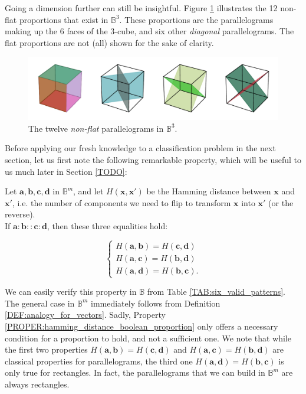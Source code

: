 Going a dimension further can still be insightful. Figure \ref{FIG:cubes_in_B3}
illustrates the 12 non-flat proportions that exist in $\mathbb{B}^3$. These
proportions are the parallelograms making up the 6 faces of the $3$-cube, and
six other \textit{diagonal} parallelograms. The flat proportions are not (all)
shown for the sake of clarity.

\begin{figure}[!h]
\centering
\includegraphics[width=\linewidth]{figures/cubes_in_B3.pdf}
  \caption{The twelve \textit{non-flat} parallelograms in $\mathbb{B}^3$.}
\label{FIG:cubes_in_B3}
\end{figure}

Before applying our fresh knowledge to a classification problem in the next
section, let us first note the following remarkable property, which will be
useful to us much later in Section \ref{TODO}:

\begin{property}
  \label{PROPER:hamming_distance_boolean_proportion}
  Let $\mathbf{a}, \mathbf{b},\mathbf{c}, \mathbf{d}$ in $\mathbb{B}^m$, and
  let $H(\mathbf{x}, \mathbf{x'})$ be the Hamming distance between $\mathbf{x}$
  and $\mathbf{x'}$, i.e. the number of components we need to flip to transform
  $\mathbf{x}$ into $\mathbf{x'}$ (or the reverse).\\
  If $\mathbf{a} : \mathbf{b}
  :: \mathbf{c} : \mathbf{d}$, then these three equalities hold:

  $$
  \begin{cases}
    H(\mathbf{a}, \mathbf{b}) = H(\mathbf{c}, \mathbf{d})\\
    H(\mathbf{a}, \mathbf{c}) = H(\mathbf{b}, \mathbf{d})\\
    H(\mathbf{a}, \mathbf{d}) = H(\mathbf{b}, \mathbf{c}).
  \end{cases}
  $$
\end{property}

We can easily verify this property in $\mathbb{B}$ from Table
\ref{TAB:six_valid_patterns}. The general case in $\mathbb{B}^m$ immediately
follows from Definition \ref{DEF:analogy_for_vectors}. Sadly, Property
\ref{PROPER:hamming_distance_boolean_proportion} only offers a necessary
condition for a proportion to hold, and not a sufficient one. We note that
while the first two properties $H(\mathbf{a}, \mathbf{b}) = H(\mathbf{c},
\mathbf{d})$ and $H(\mathbf{a}, \mathbf{c}) = H(\mathbf{b}, \mathbf{d})$ are
classical properties for parallelograms, the third one $H(\mathbf{a},
\mathbf{d}) = H(\mathbf{b}, \mathbf{c})$ is only true for rectangles. In fact,
the parallelograms that we can build in $\mathbb{B}^m$ are always rectangles.

